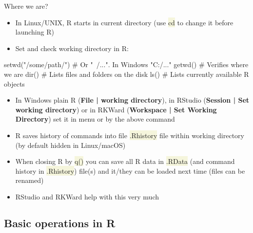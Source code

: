 \documentclass[compress, xelatex, 11pt, xcolor=svgnames, aspectratio=169,
	hyperref={
		bookmarks=true,
		unicode=true,
		colorlinks=true,
		pdftitle={Molecular data in R},
		plainpages=false,
		pdfauthor={Vojtech Zeisek},
		pdfsubject={Course about phylogeny and evolution in R},
		pdfcreator={XeLaTeX},
		pdfkeywords={R, evolution, phylogeny, molecular data},
		linkcolor=Crimson, %
		anchorcolor=Magenta, %
		citecolor=Magenta, %
		filecolor=Magenta, %
		menucolor=Magenta, %
		urlcolor=DodgerBlue, %
		},
	url={hyphens, lowtilde} %
	]{beamer}
\renewcommand{\texttt}[1]{\colorbox{Beige}{{\ttfamily #1}}}
\begin{document}
\begin{frame}[fragile]{Where we are?}
	\begin{itemize}
		\item In Linux/UNIX, R starts in current directory (use \texttt{cd} to change it before launching R)
		\item \alert{Set and check working directory} in R:
	\end{itemize}
	\begin{spluscode}
    setwd("/some/path/") # Or "~/...". In Windows "C:/..."
    getwd() # Verifies where we are
    dir() # Lists files and folders on the disk
    ls() # Lists currently available R objects
	\end{spluscode}
	\begin{itemize}
		\item In Windows plain R (\textbf{File | working directory}), in RStudio (\textbf{Session | Set working directory}) or in RKWard (\textbf{Workspace | Set Working Directory}) set it in menu or by the above command
		\item R saves history of commands into file \texttt{.Rhistory} file within working directory (by default hidden in Linux/macOS)
		\item When closing R by \texttt{q()} you can save all R data in \texttt{.RData} (and command history in \texttt{.Rhistory}) file(s) and it/they can be loaded next time (files can be renamed)
		\item RStudio and RKWard help with this very much
	\end{itemize}
\end{frame}

\subsection{Basic operations in R}
\end{document}
